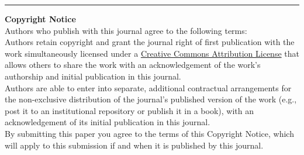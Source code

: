 \vspace{2cm}

\rule{\textwidth}{1pt}

{ \bf Copyright Notice} \\
Authors who publish with this journal agree to the following terms: \\

Authors retain copyright and grant the journal right of first publication with the work simultaneously licensed under a \href{http://creativecommons.org/licenses/by/3.0/}{Creative Commons Attribution License} that allows others to share the work with an acknowledgement of the work's authorship and initial publication in this journal. \\

Authors are able to enter into separate, additional contractual arrangements for the non-exclusive distribution of the journal's published version of the work (e.g., post it to an institutional repository or publish it in a book), with an acknowledgement of its initial publication in this journal. \\

By submitting this paper you agree to the terms of this Copyright Notice, which will apply to this submission if and when it is published by this journal.



